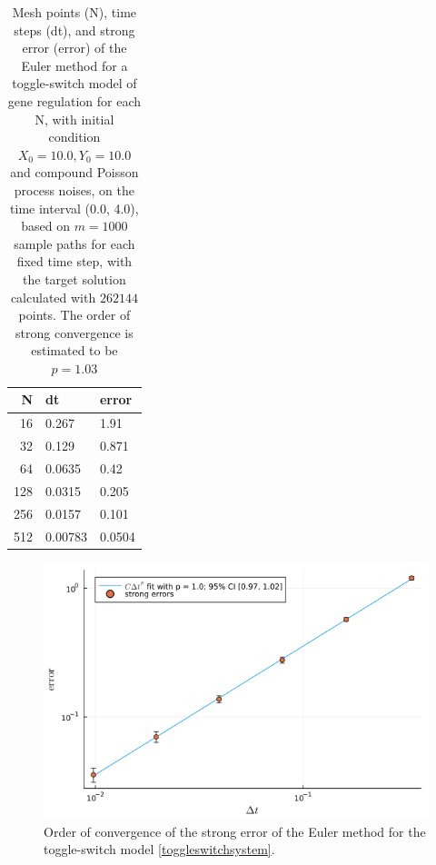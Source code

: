 \documentclass[reqno,12pt]{amsart}
\theoremstyle{plain} %
\theoremstyle{definition} %
\begin{document}
\begin{table}
    \begin{tabular}[htb]{|r|l|l|}
        \hline N & dt & error\\
        \hline \hline
        16 & 0.267 & 1.91 \\
        32 & 0.129 & 0.871 \\
        64 & 0.0635 & 0.42 \\
        128 & 0.0315 & 0.205 \\
        256 & 0.0157 & 0.101 \\
        512 & 0.00783 & 0.0504 \\
        \hline
    \end{tabular}
    \bigskip

    \caption{Mesh points (N), time steps (dt), and strong error (error) of the Euler method for a toggle-switch model of gene regulation for each N, with initial condition $X_0 = 10.0, Y_0 = 10.0$ and compound Poisson process noises, on the time interval (0.0, 4.0), based on $m = 1000$ sample paths for each fixed time step, with the target solution calculated with $262144$ points. The order of strong convergence is estimated to be $p = 1.03$}
    \label{tabletoggleswitch}
\end{table}

\begin{figure}[htb]
    \includegraphics[scale=0.4]{img/order_toggleswitch.png}
    \caption{Order of convergence of the strong error of the Euler method for the toggle-switch model \eqref{toggleswitchsystem}.}
    \label{figtoggleswitch}
\end{figure}
\end{document}
